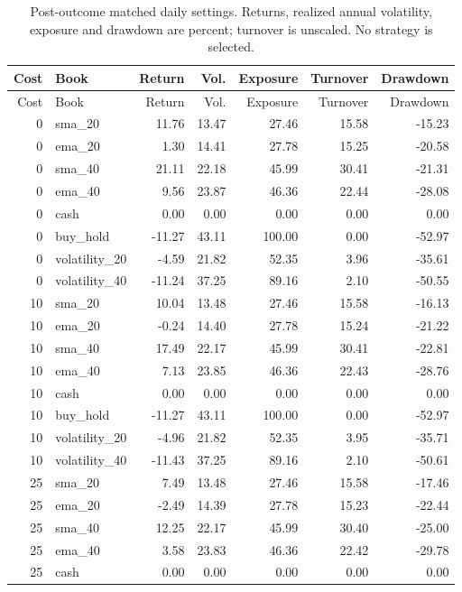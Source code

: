 \begin{longtable}{rlrrrrr}
\caption{Post-outcome matched daily settings. Returns, realized annual volatility, exposure and drawdown are percent; turnover is unscaled. No strategy is selected.}\label{tab:botextensionmetrics}\\
\toprule Cost & Book & Return & Vol. & Exposure & Turnover & Drawdown \\
\midrule\endfirsthead
\toprule Cost & Book & Return & Vol. & Exposure & Turnover & Drawdown \\
\midrule\endhead
0 & sma\_20 & 11.76 & 13.47 & 27.46 & 15.58 & -15.23 \\
0 & ema\_20 & 1.30 & 14.41 & 27.78 & 15.25 & -20.58 \\
0 & sma\_40 & 21.11 & 22.18 & 45.99 & 30.41 & -21.31 \\
0 & ema\_40 & 9.56 & 23.87 & 46.36 & 22.44 & -28.08 \\
0 & cash & 0.00 & 0.00 & 0.00 & 0.00 & 0.00 \\
0 & buy\_hold & -11.27 & 43.11 & 100.00 & 0.00 & -52.97 \\
0 & volatility\_20 & -4.59 & 21.82 & 52.35 & 3.96 & -35.61 \\
0 & volatility\_40 & -11.24 & 37.25 & 89.16 & 2.10 & -50.55 \\
10 & sma\_20 & 10.04 & 13.48 & 27.46 & 15.58 & -16.13 \\
10 & ema\_20 & -0.24 & 14.40 & 27.78 & 15.24 & -21.22 \\
10 & sma\_40 & 17.49 & 22.17 & 45.99 & 30.41 & -22.81 \\
10 & ema\_40 & 7.13 & 23.85 & 46.36 & 22.43 & -28.76 \\
10 & cash & 0.00 & 0.00 & 0.00 & 0.00 & 0.00 \\
10 & buy\_hold & -11.27 & 43.11 & 100.00 & 0.00 & -52.97 \\
10 & volatility\_20 & -4.96 & 21.82 & 52.35 & 3.95 & -35.71 \\
10 & volatility\_40 & -11.43 & 37.25 & 89.16 & 2.10 & -50.61 \\
25 & sma\_20 & 7.49 & 13.48 & 27.46 & 15.58 & -17.46 \\
25 & ema\_20 & -2.49 & 14.39 & 27.78 & 15.23 & -22.44 \\
25 & sma\_40 & 12.25 & 22.17 & 45.99 & 30.40 & -25.00 \\
25 & ema\_40 & 3.58 & 23.83 & 46.36 & 22.42 & -29.78 \\
25 & cash & 0.00 & 0.00 & 0.00 & 0.00 & 0.00 \\

\end{longtable}
